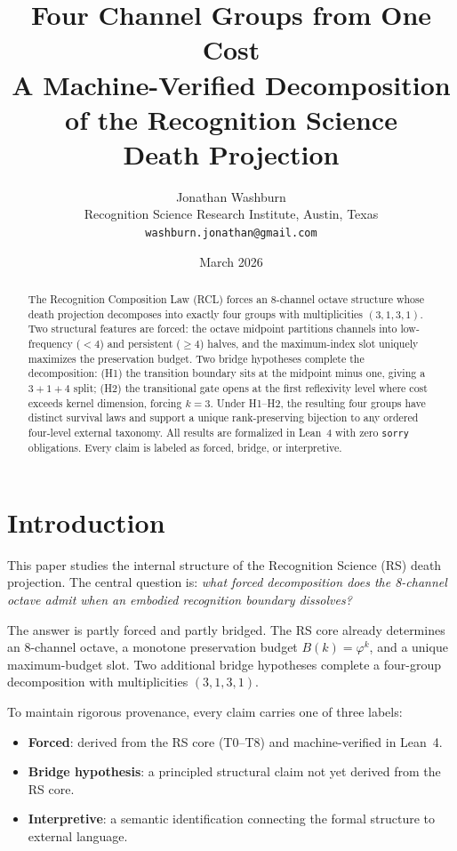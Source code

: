 \documentclass[11pt,a4paper]{article}
\title{\textbf{Four Channel Groups from One Cost}\\[0.5em]
\large A Machine-Verified Decomposition of the Recognition Science\\
Death Projection}
\author{Jonathan Washburn\\
\small Recognition Science Research Institute, Austin, Texas\\
\small \texttt{washburn.jonathan@gmail.com}}
\date{March 2026}
\theoremstyle{definition}
\newcommand{\phig}{\varphi}
\begin{document}
\maketitle

\begin{abstract}
The Recognition Composition Law (RCL) forces an 8-channel octave
structure whose death projection decomposes into exactly four groups
with multiplicities $(3,1,3,1)$. Two structural features are forced:
the octave midpoint partitions channels into low-frequency
($<4$) and persistent ($\ge 4$) halves, and the maximum-index slot
uniquely maximizes the preservation budget. Two bridge hypotheses
complete the decomposition: (H1) the transition boundary sits at the
midpoint minus one, giving a $3{+}1{+}4$ split; (H2) the transitional
gate opens at the first reflexivity level where cost exceeds kernel
dimension, forcing $k{=}3$. Under H1--H2, the resulting four groups
have distinct survival laws and support a unique rank-preserving
bijection to any ordered four-level external taxonomy. All results are
formalized in Lean~4 with zero \texttt{sorry} obligations. Every claim
is labeled as forced, bridge, or interpretive.
\end{abstract}

\tableofcontents

\section{Introduction}
\label{sec:intro}

This paper studies the internal structure of the Recognition Science
(RS) death projection. The central question is:
\emph{what forced decomposition does the 8-channel octave admit when an
embodied recognition boundary dissolves?}

The answer is partly forced and partly bridged. The RS core already
determines an 8-channel octave, a monotone preservation budget
$B(k)=\phig^k$, and a unique maximum-budget slot. Two additional bridge
hypotheses complete a four-group decomposition with multiplicities
$(3,1,3,1)$.

To maintain rigorous provenance, every claim carries one of three
labels:
\begin{itemize}
\item \textbf{Forced}: derived from the RS core (T0--T8) and
  machine-verified in Lean~4.
\item \textbf{Bridge hypothesis}: a principled structural claim
  not yet derived from the RS core.
\item \textbf{Interpretive}: a semantic identification connecting
  the formal structure to external language.
\end{itemize}
\end{document}
